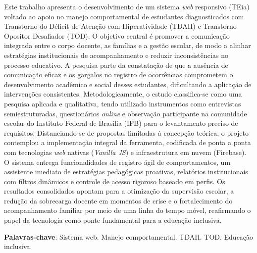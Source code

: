 
\begin{resumo}[RESUMO]

    \begin{SingleSpacing}
    
Este trabalho apresenta o desenvolvimento de um sistema \textit{web} responsivo (TEia) voltado ao apoio no manejo comportamental de estudantes diagnosticados com Transtorno do Déficit de Atenção com Hiperatividade (TDAH) e Transtorno Opositor Desafiador (TOD). O objetivo central é promover a comunicação integrada entre o corpo docente, as famílias e a gestão escolar, de modo a alinhar estratégias institucionais de acompanhamento e reduzir inconsistências no processo educativo. A pesquisa parte da constatação de que a ausência de comunicação eficaz e os gargalos no registro de ocorrências comprometem o desenvolvimento acadêmico e social desses estudantes, dificultando a aplicação de intervenções consistentes. Metodologicamente, o estudo classifica-se como uma pesquisa aplicada e qualitativa, tendo utilizado instrumentos como entrevistas semiestruturadas, questionários \textit{online} e observação participante na comunidade escolar do Instituto Federal de Brasília (IFB) para o levantamento preciso de requisitos. Distanciando-se de propostas limitadas à concepção teórica, o projeto contemplou a implementação integral da ferramenta, codificada de ponta a ponta com tecnologias \textit{web} nativas (\textit{Vanilla JS}) e infraestrutura em nuvem (Firebase). O sistema entrega funcionalidades de registro ágil de comportamentos, um assistente imediato de estratégias pedagógicas proativas, relatórios institucionais com filtros dinâmicos e controle de acesso rigoroso baseado em perfis. Os resultados consolidados apontam para a otimização da supervisão escolar, a redução da sobrecarga docente em momentos de crise e o fortalecimento do acompanhamento familiar por meio de uma linha do tempo móvel, reafirmando o papel da tecnologia como ponte fundamental para a educação inclusiva.

        \item\textbf{Palavras-chave}: Sistema web. Manejo comportamental. TDAH. TOD. Educação inclusiva.
    
    \end{SingleSpacing}
    
\end{resumo}
